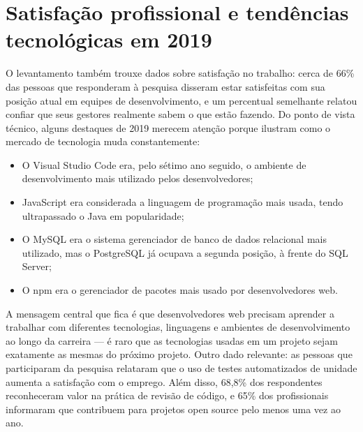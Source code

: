 \section{Satisfação profissional e tendências tecnológicas em 2019}

O levantamento também trouxe dados sobre satisfação no trabalho: cerca de 66\% das pessoas que responderam à pesquisa disseram estar satisfeitas com sua posição atual em equipes de desenvolvimento, e um percentual semelhante relatou confiar que seus gestores realmente sabem o que estão fazendo. Do ponto de vista técnico, alguns destaques de 2019 merecem atenção porque ilustram como o mercado de tecnologia muda constantemente:

\begin{itemize}
  \item O Visual Studio Code era, pelo sétimo ano seguido, o ambiente de desenvolvimento mais utilizado pelos desenvolvedores;
\end{itemize}

\begin{itemize}
  \item JavaScript era considerada a linguagem de programação mais usada, tendo ultrapassado o Java em popularidade;
\end{itemize}

\begin{itemize}
  \item O MySQL era o sistema gerenciador de banco de dados relacional mais utilizado, mas o PostgreSQL já ocupava a segunda posição, à frente do SQL Server;
\end{itemize}

\begin{itemize}
  \item O npm era o gerenciador de pacotes mais usado por desenvolvedores web.
\end{itemize}

A mensagem central que fica é que desenvolvedores web precisam aprender a trabalhar com diferentes tecnologias, linguagens e ambientes de desenvolvimento ao longo da carreira — é raro que as tecnologias usadas em um projeto sejam exatamente as mesmas do próximo projeto. Outro dado relevante: as pessoas que participaram da pesquisa relataram que o uso de testes automatizados de unidade aumenta a satisfação com o emprego. Além disso, 68,8\% dos respondentes reconheceram valor na prática de revisão de código, e 65\% dos profissionais informaram que contribuem para projetos open source pelo menos uma vez ao ano.

